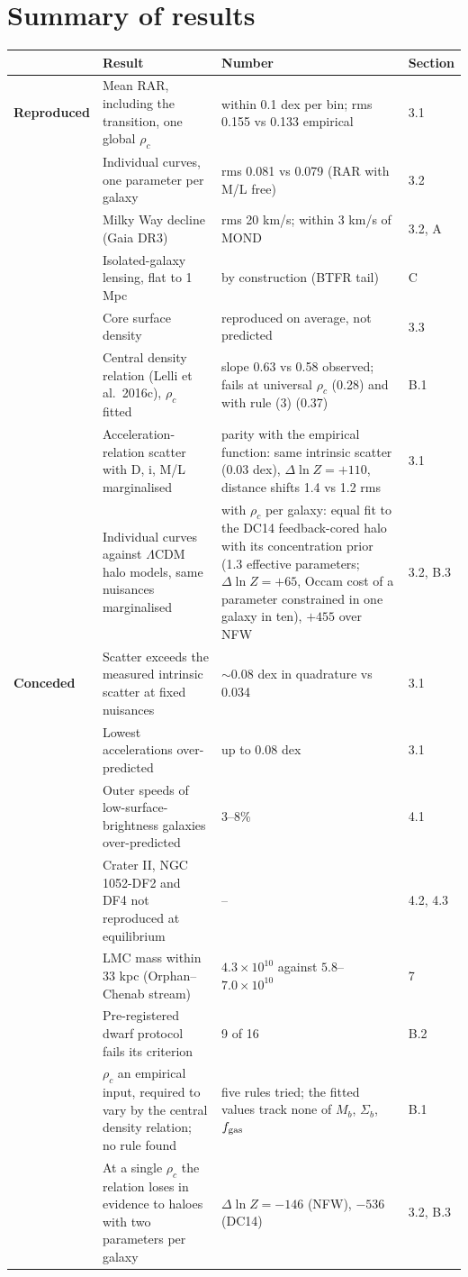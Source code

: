 \documentclass[
  10pt,
]{article}
\begin{document}
\clearpage
\section{Summary of results}\label{summary}

{\small
\begin{longtable}[]{@{}p{2.0cm}p{6.0cm}p{5.5cm}p{1.5cm}@{}}
\toprule
 & Result & Number & Section\tabularnewline
\midrule
\endhead
\textbf{Reproduced} & Mean RAR, including the transition, one global $\rho_c$ & within 0.1 dex per bin; rms 0.155 vs 0.133 empirical & 3.1\tabularnewline
 & Individual curves, one parameter per galaxy & rms 0.081 vs 0.079 (RAR with M/L free) & 3.2\tabularnewline
 & Milky Way decline (Gaia DR3) & rms 20 km/s; within 3 km/s of MOND & 3.2, A\tabularnewline
 & Isolated-galaxy lensing, flat to 1 Mpc & by construction (BTFR tail) & C\tabularnewline
 & Core surface density & reproduced on average, not predicted & 3.3\tabularnewline
 & Central density relation (Lelli et al.~2016c), $\rho_c$ fitted & slope 0.63 vs 0.58 observed; fails at universal $\rho_c$ (0.28) and with rule (3) (0.37) & B.1\tabularnewline
 & Acceleration-relation scatter with D, i, M/L marginalised & parity with the empirical function: same intrinsic scatter (0.03 dex), $\Delta\ln Z=+110$, distance shifts 1.4 vs 1.2 rms & 3.1\tabularnewline
 & Individual curves against $\Lambda$CDM halo models, same nuisances marginalised & with $\rho_c$ per galaxy: equal fit to the DC14 feedback-cored halo with its concentration prior (1.3 effective parameters; $\Delta\ln Z=+65$, Occam cost of a parameter constrained in one galaxy in ten), $+455$ over NFW & 3.2, B.3\tabularnewline
\midrule
\textbf{Conceded} & Scatter exceeds the measured intrinsic scatter at fixed nuisances & $\sim$0.08 dex in quadrature vs 0.034 & 3.1\tabularnewline
 & Lowest accelerations over-predicted & up to 0.08 dex & 3.1\tabularnewline
 & Outer speeds of low-surface-brightness galaxies over-predicted & 3--8\% & 4.1\tabularnewline
 & Crater II, NGC 1052-DF2 and DF4 not reproduced at equilibrium & -- & 4.2, 4.3\tabularnewline
 & LMC mass within 33 kpc (Orphan--Chenab stream) & $4.3\times10^{10}$ against $5.8$--$7.0\times10^{10}$ & 7\tabularnewline
 & Pre-registered dwarf protocol fails its criterion & 9 of 16 & B.2\tabularnewline
 & $\rho_c$ an empirical input, required to vary by the central density relation; no rule found & five rules tried; the fitted values track none of $M_b$, $\Sigma_b$, $f_{\rm gas}$ & B.1\tabularnewline
 & At a single $\rho_c$ the relation loses in evidence to haloes with two parameters per galaxy & $\Delta\ln Z=-146$ (NFW), $-536$ (DC14) & 3.2, B.3\tabularnewline

\end{longtable}}
\end{document}
